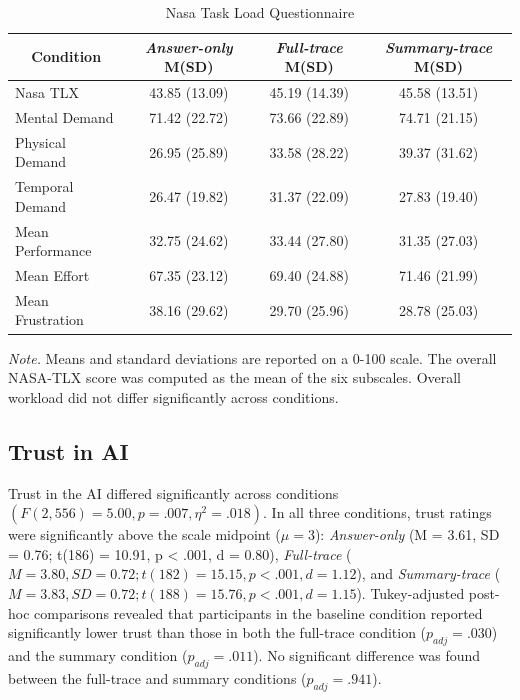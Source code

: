 \documentclass[acmlarge,review=true, anonymous=true]{acmart}
\begin{document}
\begin{table}[H]
\centering
\caption{Nasa Task Load Questionnaire}
\begin{tabular}{lccc}
\hline
\multicolumn{1}{c}{Condition} & \textit{Answer-only} M(SD)    & \textit{Full-trace} M(SD)      & \textit{Summary-trace}   M(SD)    \\ \hline
Nasa TLX                      & 43.85 (13.09) & 45.19 (14.39) & 45.58 (13.51) \\
Mental Demand                 & 71.42 (22.72) & 73.66 (22.89) & 74.71 (21.15) \\
Physical Demand               & 26.95 (25.89) & 33.58 (28.22) & 39.37 (31.62) \\
Temporal Demand               & 26.47 (19.82) & 31.37 (22.09) & 27.83 (19.40) \\
Mean Performance              & 32.75 (24.62) & 33.44 (27.80) & 31.35 (27.03) \\
Mean Effort                   & 67.35 (23.12) & 69.40 (24.88) & 71.46 (21.99)  \\
Mean Frustration              & 38.16 (29.62) & 29.70 (25.96) & 28.78 (25.03)   \\
\hline
\end{tabular}
\label{tab:nasa}

\raggedright \small \textit{Note.} Means and standard deviations are reported on a 0-100 scale. The overall NASA-TLX score was computed as the mean of the six subscales. Overall workload did not differ significantly across conditions.
\end{table}




\subsection{Trust in AI }
Trust in the AI differed significantly across conditions $(F(2,556) = 5.00, p = .007,\eta^2 = .018)$. In all three conditions, trust ratings were significantly above the scale midpoint ($\mu = 3$): \textit{Answer-only} (M = 3.61, SD = 0.76; t(186) = 10.91, p < .001, d = 0.80), \textit{Full-trace} ($M = 3.80, SD = 0.72; t(182) = 15.15, p < .001, d = 1.12$), and \textit{Summary-trace} ($M = 3.83, SD = 0.72; t(188) = 15.76, p < .001, d = 1.15$). Tukey-adjusted post-hoc comparisons revealed that participants in the baseline condition reported significantly lower trust than those in both the full-trace condition ($p_{adj} = .030$) and the summary condition ($p_{adj} = .011$). No significant difference was found between the full-trace and summary conditions ($p_{adj} = .941$). 
\end{document}

